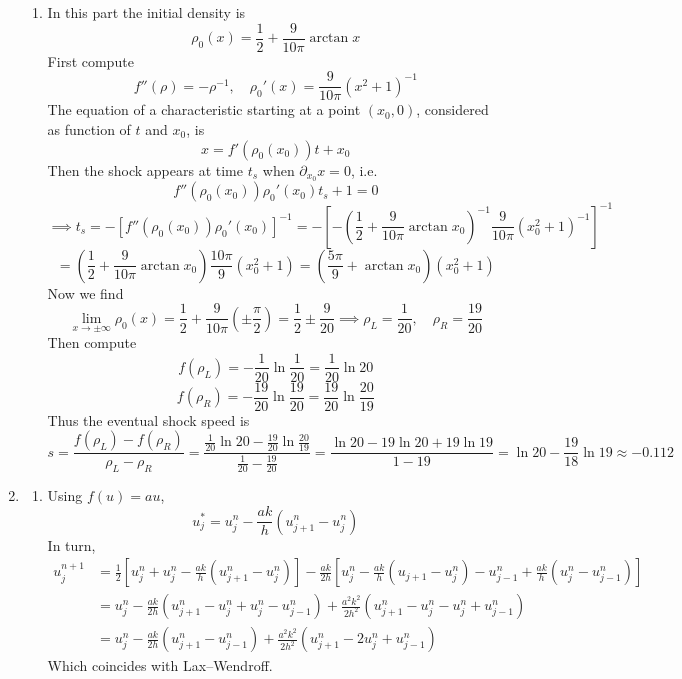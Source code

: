 \documentclass{article}
\newcommand{\br}[1]{\left(#1\right)}
\newcommand{\sbr}[1]{\left[#1\right]}
\newcommand{\inv}{^{-1}}
\newcommand{\imp}{\implies}
\newcommand{\ptl}{\partial}
\begin{document}
\begin{enumerate}
\begin{enumerate}
	
	\item In this part the initial density is
	$$\rho_0(x) = \frac12 + \frac{9}{10\pi}\arctan x$$
	First compute
	$$f''(\rho) = -\rho\inv,
	\quad \rho_0'(x) = \frac{9}{10\pi}(x^2+1)\inv$$
	The equation of a characteristic starting at a point $(x_0,0)$, considered as function of $t$ and $x_0$, is
	$$x = f'(\rho_0(x_0))t + x_0$$
	Then the shock appears at time $t_s$ when $\ptl_{x_0}x=0$, i.e.
	$$f''(\rho_0(x_0))\rho_0'(x_0)t_s + 1 = 0$$
	$$\imp t_s = -\sbr{f''(\rho_0(x_0))\rho_0'(x_0)}\inv
	= -\sbr{-\br{\frac12 + \frac{9}{10\pi}\arctan x_0}\inv \frac{9}{10\pi}(x_0^2+1)\inv}\inv$$
	$$= \br{\frac12 + \frac{9}{10\pi}\arctan x_0} \frac{10\pi}{9}(x_0^2+1)
	= \br{\frac{5\pi}{9} + \arctan x_0}(x_0^2 + 1)$$
	Now we find
	$$\lim_{x\to\pm\infty}\rho_0(x) = \frac12 + \frac{9}{10\pi}\br{\pm\frac\pi2}
	= \frac12 \pm \frac{9}{20}
	\imp \rho_L = \frac{1}{20},
	\quad \rho_R = \frac{19}{20}$$
	Then compute
	$$f(\rho_L) = -\frac{1}{20}\ln\frac{1}{20} = \frac{1}{20}\ln20$$
	$$f(\rho_R) = -\frac{19}{20}\ln\frac{19}{20} = \frac{19}{20}\ln\frac{20}{19}$$
	Thus the eventual shock speed is
	$$s = \frac{f(\rho_L) - f(\rho_R)}{\rho_L - \rho_R}
	= \frac{\frac{1}{20}\ln20 - \frac{19}{20}\ln\frac{20}{19}}{\frac{1}{20} - \frac{19}{20}}
	= \frac{\ln20 - 19\ln20 + 19\ln19}{1 - 19}
	= \ln20 - \frac{19}{18}\ln19
	\approx -0.112$$


\end{enumerate}



\item

\begin{enumerate}
	
	
	\item Using $f(u)=au$,
	$$u_j^* = u_j^n - \frac{ak}{h}(u_{j+1}^n - u_j^n)$$
	In turn,
	\begin{align*}
		u_j^{n+1} &= \frac12\sbr{u_j^n + u_j^n - \frac{ak}{h}(u_{j+1}^n - u_j^n)} - \frac{ak}{2h}\sbr{u_j^n - \frac{ak}{h}(u_{j+1} - u_j^n) - u_{j-1}^n + \frac{ak}{h}(u_j^n - u_{j-1}^n)}\\
		&= u_j^n - \frac{ak}{2h}(u_{j+1}^n - u_j^n + u_j^n - u_{j-1}^n) + \frac{a^2k^2}{2h^2}(u_{j+1}^n - u_j^n - u_j^n + u_{j-1}^n)\\
		&= u_j^n - \frac{ak}{2h}(u_{j+1}^n - u_{j-1}^n) + \frac{a^2k^2}{2h^2}(u_{j+1}^n - 2u_j^n + u_{j-1}^n)
	\end{align*}
	Which coincides with Lax--Wendroff.
	
	
\end{enumerate}




\end{enumerate}
\end{document}
